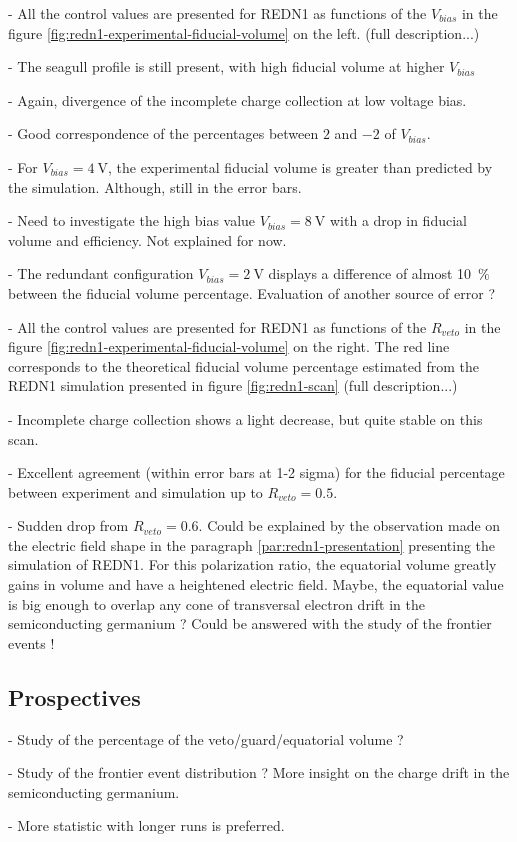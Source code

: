 - All the control values are presented for REDN1 as functions of the $V_{bias}$ in the figure \ref{fig:redn1-experimental-fiducial-volume} on the left. (full description...)

- The seagull profile is still present, with high fiducial volume at higher $V_{bias}$

- Again, divergence of the incomplete charge collection at low voltage bias.

- Good correspondence of the percentages between $2$ and $-2$ of $V_{bias}$.

- For $V_{bias}=\SI{4}{\volt}$, the  experimental fiducial volume is greater than predicted by the simulation. Although, still in the error bars.

- Need to investigate the high bias value $V_{bias} = \SI{8}{\volt}$ with a drop in fiducial volume and efficiency. Not explained for now.

- The redundant configuration $V_{bias} = \SI{2}{\volt}$ displays a difference of almost \SI{10}{\percent} between the fiducial volume percentage. Evaluation of another source of error ?

- All the control values are presented for REDN1 as functions of the $R_{veto}$ in the figure \ref{fig:redn1-experimental-fiducial-volume} on the right. The red line corresponds to the theoretical fiducial volume percentage estimated from the REDN1 simulation presented in figure \ref{fig:redn1-scan} (full description...)

- Incomplete charge collection shows a light decrease, but quite stable on this scan.

- Excellent agreement  (within error bars at 1-2 sigma) for the fiducial percentage between experiment and simulation up to $R_{veto} = 0.5$.

- Sudden drop from $R_{veto} = 0.6$. Could be explained by the observation made on the electric field shape in the paragraph \ref{par:redn1-presentation} presenting the simulation of REDN1. For this polarization ratio, the equatorial volume greatly gains in volume and have a heightened electric field. Maybe, the equatorial value is big enough to overlap any cone of transversal electron drift in the semiconducting germanium ?
Could be answered with the study of the frontier events !
 

\subsection{Prospectives}

- Study of the percentage of the veto/guard/equatorial volume ?

- Study of the frontier event distribution ? More insight on the charge drift in the semiconducting germanium.

- More statistic with longer runs is preferred.

